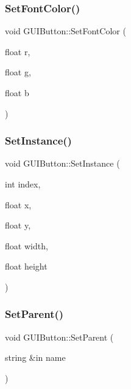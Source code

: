 \subsubsection{\texorpdfstring{Set\+Font\+Color()}{SetFontColor()}}
{\footnotesize\ttfamily void G\+U\+I\+Button\+::\+Set\+Font\+Color (\begin{DoxyParamCaption}\item[{float}]{r,  }\item[{float}]{g,  }\item[{float}]{b }\end{DoxyParamCaption})}

\hypertarget{class_g_u_i_button_ac8127b8802acc9f246071366df61f783}{}\label{class_g_u_i_button_ac8127b8802acc9f246071366df61f783} 
\subsubsection{\texorpdfstring{Set\+Instance()}{SetInstance()}}
{\footnotesize\ttfamily void G\+U\+I\+Button\+::\+Set\+Instance (\begin{DoxyParamCaption}\item[{int}]{index,  }\item[{float}]{x,  }\item[{float}]{y,  }\item[{float}]{width,  }\item[{float}]{height }\end{DoxyParamCaption})}

\hypertarget{class_g_u_i_button_ae7a165dcbaab5f0a8eac523efe5447d2}{}\label{class_g_u_i_button_ae7a165dcbaab5f0a8eac523efe5447d2} 
\subsubsection{\texorpdfstring{Set\+Parent()}{SetParent()}}
{\footnotesize\ttfamily void G\+U\+I\+Button\+::\+Set\+Parent (\begin{DoxyParamCaption}\item[{string \&in}]{name }\end{DoxyParamCaption})}

\hypertarget{class_g_u_i_button_ac8308f42ff4a9df850490092846ab9a5}{}\label{class_g_u_i_button_ac8308f42ff4a9df850490092846ab9a5} 
